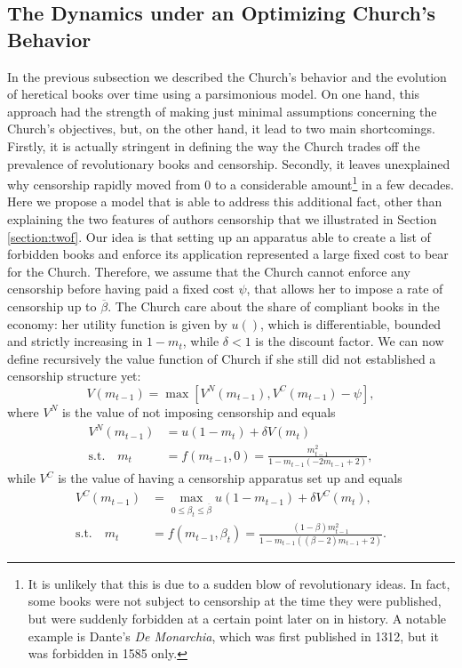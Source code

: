\documentclass[12pt]{article}
\begin{document}
\subsection{The Dynamics under an Optimizing Church's Behavior}
In the previous subsection we described the Church's behavior and the evolution of heretical books over time using a parsimonious model. On one hand, this approach had the strength of making just minimal assumptions concerning the Church's objectives, but, on the other hand, it lead to two main shortcomings. Firstly, it is actually stringent in defining the way the Church trades off the prevalence of revolutionary books and censorship. Secondly, it leaves unexplained why censorship rapidly moved from 0 to a considerable amount\footnote{It is unlikely that this is due to a sudden blow of revolutionary ideas. In fact, some books were not subject to censorship at the time they were published, but were suddenly forbidden at a certain point later on in history. A notable example is Dante's \textit{De Monarchia}, which was first published in 1312, but it was forbidden in 1585 only.} in a few decades. Here we propose a model that is able to address this additional fact, other than explaining the two features of authors censorship that we illustrated in Section \ref{section:twof}. Our idea is that setting up an apparatus able to create a list of forbidden books and enforce its application represented a large fixed cost to bear for the Church. Therefore, we assume that the Church cannot enforce any censorship before having paid a fixed cost $\psi$, that allows her to impose a rate of censorship up to $\overline{\beta}$. The Church care about the share of compliant books in the economy: her utility function is given by $u()$, which is differentiable, bounded and strictly increasing in $1-m_t$, while $\delta<1$ is the discount factor. We can now define recursively the value function of Church if she still did not established a censorship structure yet:
\begin{equation*}	
	V(m_{t-1})=\max[V^N(m_{t-1}),V^C(m_{t-1})-\psi],
\end{equation*}
where $V^{N}$ is the value of not imposing censorship and equals
\begin{align*}
V^{N}(m_{t-1})&=u(1-m_{t})+\delta V(m_{t})	\\
	 \text{s.t.}\quad m_{t}&=f(m_{t-1},0)=\frac{ m_{t-1}^2}{1-m_{t-1} (-2 m_{t-1}+2)},
\end{align*}
while $V^{C}$ is the value of having a censorship apparatus set up and equals
\begin{align*}
V^{C}(m_{t-1})&=\max_{0\leq\beta_t\leq\overline{\beta}}u(1-m_{t-1})+\delta V^C(m_{t}),	\\
	 \text{s.t.}\quad m_{t}&=f(m_{t-1},\beta_t)=\frac{(1-\beta) m_{t-1}^2}{1-m_{t-1} ((\beta -2) m_{t-1}+2)}.
\end{align*}
\end{document}
